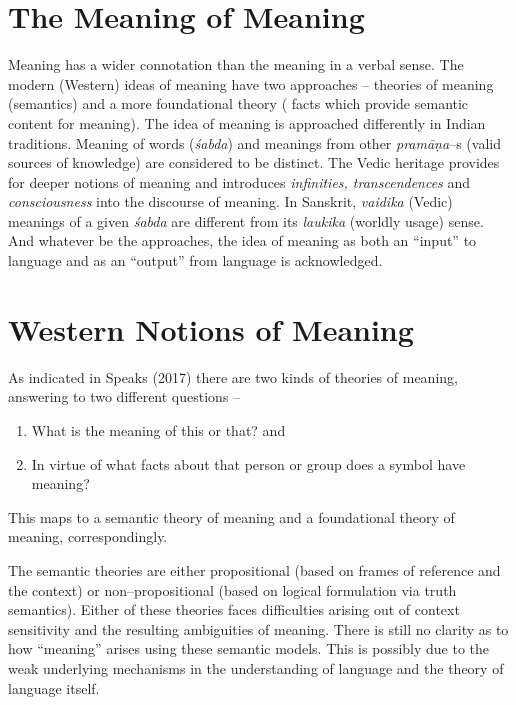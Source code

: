 \section*{The Meaning of Meaning}

Meaning has a wider connotation than the meaning in a verbal sense. The modern (Western) ideas of meaning have two approaches – theories of meaning (semantics) and a more foundational theory ( facts which provide semantic content for meaning). The idea of meaning is approached differently in Indian traditions. Meaning of words (\textit{śabda}) and meanings from other \textit{pramāṇa}–s (valid sources of knowledge) are considered to be distinct. The Vedic heritage provides for deeper notions of meaning and introduces \textit{infinities, transcendences} and \textit{consciousness} into the discourse of meaning. In Sanskrit, \textit{vaidika} (Vedic) meanings of a given \textit{śabda} are different from its \textit{laukika} (worldly usage) sense. And whatever be the approaches, the idea of meaning as both an “input” to language and as an “output” from language is acknowledged.

\newpage


\section*{Western Notions of Meaning}

\vskip -5pt

As indicated in Speaks (2017) there are two kinds of theories of meaning, answering to two different questions –

\begin{enumerate}
\itemsep=0pt
\item What is the meaning of this or that? and

 \item In virtue of what facts about that person or group does a symbol have meaning?

\end{enumerate}

This maps to a semantic theory of meaning and a foundational theory of meaning, correspondingly.

The semantic theories are either propositional  (based on frames of reference and the context) or non–propositional (based on logical formulation via truth semantics). Either of these theories faces difficulties arising out of context sensitivity and the resulting ambiguities of meaning. There is still no clarity as to how “meaning” arises using these semantic models. This is possibly due to the weak underlying mechanisms in the understanding of language and the theory of language itself.

